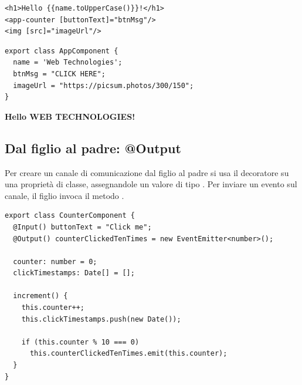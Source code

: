 \begin{affianco}[0.46][c]
\begin{lstlisting}[style=html, name=app.component.html]
<h1>Hello {{name.toUpperCase()}}!</h1>
<app-counter [buttonText]="btnMsg"/>
<img [src]="imageUrl"/>
\end{lstlisting}

\begin{lstlisting}[style=ts, name=app.component.ts]
export class AppComponent {
  name = 'Web Technologies';
  btnMsg = "CLICK HERE";
  imageUrl = "https://picsum.photos/300/150";
}
\end{lstlisting}
\risultato
\begin{browser}[AngularApp]
  {\Lato\bfseries\LARGE\color{css-darkblue} Hello WEB TECHNOLOGIES!\par}\vspace{6pt}
  \par\vspace{6pt}
\end{browser}
\end{affianco}


\subsection{Dal figlio al padre: @Output}

Per creare un canale di comunicazione dal figlio al padre si usa il decoratore
 su una proprietà di classe, assegnandole un valore di tipo
. Per inviare un evento sul canale, il figlio invoca il
metodo .

\begin{lstlisting}[style=ts, name=counter.component.ts]
export class CounterComponent {
  @Input() buttonText = "Click me";
  @Output() counterClickedTenTimes = new EventEmitter<number>();

  counter: number = 0;
  clickTimestamps: Date[] = [];

  increment() {
    this.counter++;
    this.clickTimestamps.push(new Date());

    if (this.counter % 10 === 0)
      this.counterClickedTenTimes.emit(this.counter);
  }
}
\end{lstlisting}

